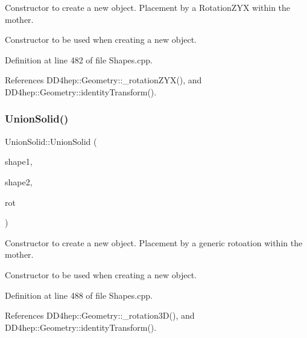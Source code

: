 Constructor to create a new object. Placement by a Rotation\+Z\+YX within the mother. 

Constructor to be used when creating a new object. 

Definition at line 482 of file Shapes.\+cpp.



References D\+D4hep\+::\+Geometry\+::\+\_\+rotation\+Z\+Y\+X(), and D\+D4hep\+::\+Geometry\+::identity\+Transform().

\hypertarget{class_d_d4hep_1_1_geometry_1_1_union_solid_ab24f18730c80761ea9acb96e802242c3}{}\label{class_d_d4hep_1_1_geometry_1_1_union_solid_ab24f18730c80761ea9acb96e802242c3} 
\subsubsection{\texorpdfstring{Union\+Solid()}{UnionSolid()}\hspace{0.1cm}{\footnotesize\ttfamily [7/8]}}
{\footnotesize\ttfamily Union\+Solid\+::\+Union\+Solid (\begin{DoxyParamCaption}\item[{const \hyperlink{namespace_d_d4hep_1_1_geometry_a83de90a8dcc7378ba47d54ef9a6a687b}{Solid} \&}]{shape1,  }\item[{const \hyperlink{namespace_d_d4hep_1_1_geometry_a83de90a8dcc7378ba47d54ef9a6a687b}{Solid} \&}]{shape2,  }\item[{const \hyperlink{namespace_d_d4hep_1_1_geometry_a022fecb763315fa2bf39cbb648944a0e}{Rotation3D} \&}]{rot }\end{DoxyParamCaption})}



Constructor to create a new object. Placement by a generic rotoation within the mother. 

Constructor to be used when creating a new object. 

Definition at line 488 of file Shapes.\+cpp.



References D\+D4hep\+::\+Geometry\+::\+\_\+rotation3\+D(), and D\+D4hep\+::\+Geometry\+::identity\+Transform().

\hypertarget{class_d_d4hep_1_1_geometry_1_1_union_solid_ad75ca3619515031cb82d0474bd8c6fc2}{}\label{class_d_d4hep_1_1_geometry_1_1_union_solid_ad75ca3619515031cb82d0474bd8c6fc2} 
